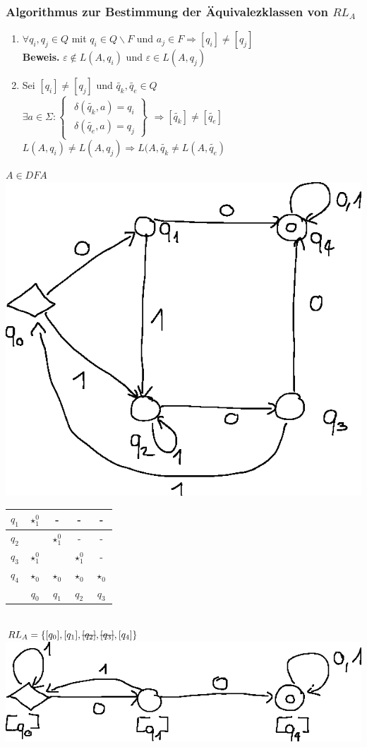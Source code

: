 \documentclass[10pt]{article}
\newcommand{\Bold}[1]{\textbf{#1}} %
\newcommand{\T}[1]{\text{#1}} %
\newcommand{\Nicht}[1]{\T{\sout{$ #1 $}}} %
\newcommand{\Ra}{\Rightarrow}
\newcommand{\Brackal}[2]{\left\lbrace\begin{array}{#1} #2 \end{array}\right.} %
\newcommand{\Brackar}[2]{\left.\begin{array}{#1} #2 \end{array}\right\rbrace} %
\begin{document}
\subsubsection{Algorithmus zur Bestimmung der \"Aquivalezklassen von $RL_A$}
\begin{enumerate}
 \item $\forall q_i,q_j\in Q$ mit $q_i\in Q\backslash F$ und $a_j\in F\Ra [q_i]\neq [q_j]$\\
 \Bold{Beweis.} $\varepsilon\notin L(A,q_i)$ und $\varepsilon\in L(A,q_j)$
 \item Sei $[q_i]\neq[q_j]$ und $\tilde{q_k},\tilde{q_e}\in Q$\\
 $\exists a\in\Sigma:\Brackal{l}{\Brackar{l}{\delta(\tilde{q_k},a)=q_i\\\delta(\tilde{q_e},a)=q_j}}\Ra[\tilde{q_k}]\neq[\tilde{q_e}]$\\
 $L(A,q_i)\neq L(A,q_j)\Ra L(A,\tilde{q_k}\neq L(A,\tilde{q_e})$
\end{enumerate}
$A\in DFA$\\
\includegraphics{Bild18.eps}\\
\begin{tabular}{c|c|c|c|c|}
 \hline $q_1$&$\star_1^0$&-&-&-\\\hline
 $q_2$&&$\star_1^0$&-&-\\\hline
 $q_3$&$\star_1^0$&&$\star_1^0$&-\\\hline
 $q_4$&$\star_0$&$\star_0$&$\star_0$&$\star_0$\\\hline
 &$q_0$&$q_1$&$q_2$&$q_3$
\end{tabular}\\
$RL_A=\{[q_0],[q_1],\Nicht{[q_2]},\Nicht{[q_3]},[q_4]\}$\\
\includegraphics{Bild19.eps}\\
\end{document}
